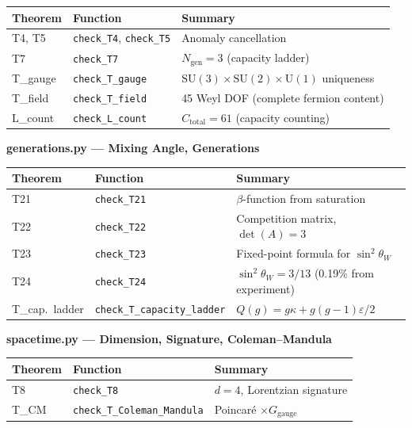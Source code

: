 \documentclass[11pt]{article}
\newcommand{\SU}{\mathrm{SU}}
\newcommand{\U}{\mathrm{U}}
\begin{document}
\smallskip
\begin{center}
\small
\begin{tabular}{lll}
\toprule
\textbf{Theorem} & \textbf{Function} & \textbf{Summary} \\
\midrule
T4, T5 & \texttt{check\_T4}, \texttt{check\_T5} & Anomaly cancellation \\
T7 & \texttt{check\_T7} & $N_{\mathrm{gen}} = 3$ (capacity ladder) \\
T\_gauge & \texttt{check\_T\_gauge} & $\SU(3)\times\SU(2)\times\U(1)$ uniqueness \\
T\_field & \texttt{check\_T\_field} & 45 Weyl DOF (complete fermion content) \\
L\_count & \texttt{check\_L\_count} & $C_{\mathrm{total}} = 61$ (capacity counting) \\
\bottomrule
\end{tabular}
\end{center}

\medskip
\noindent\textbf{generations.py --- Mixing Angle, Generations}

\smallskip
\begin{center}
\small
\begin{tabular}{lll}
\toprule
\textbf{Theorem} & \textbf{Function} & \textbf{Summary} \\
\midrule
T21 & \texttt{check\_T21} & $\beta$-function from saturation \\
T22 & \texttt{check\_T22} & Competition matrix, $\det(A)=3$ \\
T23 & \texttt{check\_T23} & Fixed-point formula for $\sin^2\!\theta_W$ \\
T24 & \texttt{check\_T24} & $\sin^2\!\theta_W = 3/13$ (0.19\% from experiment) \\
T\_cap.\ ladder & \texttt{check\_T\_capacity\_ladder} & $Q(g) = g\kappa + g(g-1)\varepsilon/2$ \\
\bottomrule
\end{tabular}
\end{center}

\medskip
\noindent\textbf{spacetime.py --- Dimension, Signature, Coleman--Mandula}

\smallskip
\begin{center}
\small
\begin{tabular}{lll}
\toprule
\textbf{Theorem} & \textbf{Function} & \textbf{Summary} \\
\midrule
T8 & \texttt{check\_T8} & $d=4$, Lorentzian signature \\
T\_CM & \texttt{check\_T\_Coleman\_Mandula} & Poincar\'e $\times G_{\mathrm{gauge}}$ \\
\bottomrule
\end{tabular}
\end{center}
\end{document}

